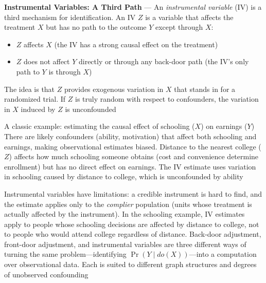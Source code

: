 
\textbf{Instrumental Variables: A Third Path} --- An \emph{instrumental variable}
(IV) is a third mechanism for identification. An IV $Z$ is a variable that
affects the treatment $X$ but has no path to the outcome $Y$ except through $X$:

\begin{itemize}
  \item $Z$ affects $X$ (the IV has a strong causal effect on the treatment)

  \item $Z$ does not affect $Y$ directly or through any back-door path (the IV's
    only path to $Y$ is through $X$)
\end{itemize}

The idea is that $Z$ provides exogenous variation in $X$ that stands in for a randomized
trial. If $Z$ is truly random with respect to confounders, the variation in $X$ induced
by $Z$ is unconfounded

A classic example: estimating the causal effect of schooling ($X$) on earnings ($Y$)
There are likely confounders (ability, motivation) that affect both schooling
and earnings, making observational estimates biased. Distance to the nearest
college ($Z$) affects how much schooling someone obtains (cost and convenience determine
enrollment) but has no direct effect on earnings. The IV estimate uses variation
in schooling caused by distance to college, which is unconfounded by ability

Instrumental variables have limitations: a credible instrument is hard to find, and
the estimate applies only to the \emph{complier} population (units whose treatment
is actually affected by the instrument). In the schooling example, IV estimates
apply to people whose schooling decisions are affected by distance to college, not
to people who would attend college regardless of distance. Back-door adjustment,
front-door adjustment, and instrumental variables are three different ways of
turning the same problem—identifying $\Pr(Y \mid do(X))$—into a computation over
observational data. Each is suited to different graph structures and degrees of
unobserved confounding

